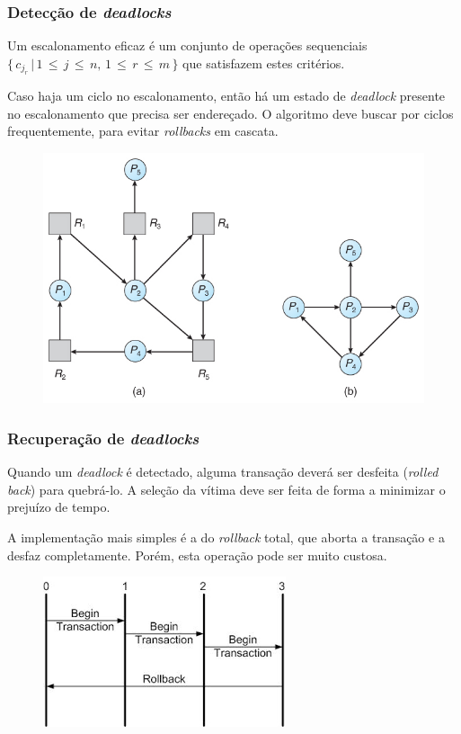\documentclass{beamer}
\begin{document}

\begin{frame} %
    \frametitle{Detecção de \emph{deadlocks}}
    \begin{theorem}

        Um escalonamento eficaz é um conjunto de operações sequenciais \(\{\, c_{j_{r}} \, | \, 1 \, \leq \, j \, \leq \, n, \, 1 \, \leq \, r \, \leq \, m\, \}\) que satisfazem estes critérios.

        \medskip
        Caso haja um ciclo no escalonamento, então há um estado de \emph{deadlock} presente no escalonamento que precisa ser endereçado. O algoritmo deve buscar por ciclos frequentemente, para evitar \emph{rollbacks} em cascata.

    \end{theorem}

    \begin{figure}
        \includegraphics[width=0.5\linewidth]{deadlockdetection1.jpg}
    \end{figure}
\end{frame}



\begin{frame} %
    \frametitle{Recuperação de \emph{deadlocks}}

    Quando um \emph{deadlock} é detectado, alguma transação deverá ser desfeita (\emph{rolled back}) para quebrá-lo. A seleção da vítima deve ser feita de forma a minimizar o prejuízo de tempo.

    \medskip
    A implementação mais simples é a do \emph{rollback} total, que aborta a transação e a desfaz completamente. Porém, esta operação pode ser muito custosa.

    \begin{figure}
        \includegraphics[width=0.5\linewidth]{completerollback.png}
    \end{figure}

\end{frame}
\end{document}
